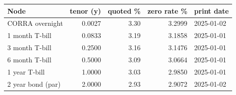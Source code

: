 \begin{center}\small
\begin{tabular}{|l|r|r|r|l|}
\hline
Node & tenor (y) & quoted \% & zero rate \% & print date \\ \hline
CORRA overnight & 0.0027 & 3.30 & 3.2999 & 2025-01-02 \\
1 month T-bill & 0.0833 & 3.19 & 3.1858 & 2025-01-01 \\
3 month T-bill & 0.2500 & 3.16 & 3.1476 & 2025-01-01 \\
6 month T-bill & 0.5000 & 3.09 & 3.0664 & 2025-01-01 \\
1 year T-bill & 1.0000 & 3.03 & 2.9850 & 2025-01-01 \\
2 year bond (par) & 2.0000 & 2.93 & 2.9072 & 2025-01-02 \\
\hline
\end{tabular}
\end{center}
